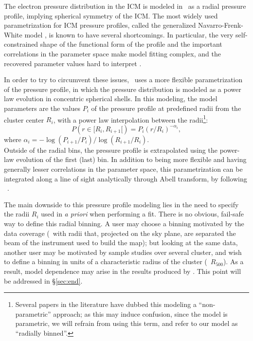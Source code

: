The electron pressure distribution in the ICM is modeled in \panco\ as a radial pressure profile, implying spherical symmetry of the ICM.
The most widely used parametrization for ICM pressure profiles, called the generalized Navarro-Frenk-White model \citep[gNFW,][]{zhao_analytical_1996, nagai_effects_2007}, is known to have several shortcomings.
In particular, the very self-constrained shape of the functional form of the profile and the important correlations in the parameter space make model fitting complex, and the recovered parameter values hard to interpret \citep[see \eg][]{nagai_effects_2007, battaglia_cluster_2012-1, sayers_evolution_2022}.

In order to try to circumvent these issues, \panco\ uses a more flexible parametrization of the pressure profile, in which the pressure distribution is modeled as a power law evolution in concentric spherical shells.
In this modeling, the model parameters are the values $P_i$ of the pressure profile at predefined radii from the cluster center $R_i$, with a power law interpolation between the radii\footnote{Several papers in the literature have dubbed this modeling a ``non-parametric'' approach; as this may induce confusion, since the model is parametric, we will refrain from using this term, and refer to our model as ``radially binned''.}:
\begin{equation}
    \label{eq:algo:pressure_profile}
    P(r \in [R_i, R_{i+1}[) = P_i \left(r / R_i\right)^{-\alpha_i},
\end{equation}
where $\alpha_i = - \log(P_{i+1} / P_i) / \log(R_{i+1} / R_i)$. \\
Outside of the radial bins, the pressure profile is extrapolated using the power-law evolution of the first (last) bin.
In addition to being more flexible and having generally lesser correlations in the parameter space, this parametrization can be integrated along a line of sight analytically through Abell transform, by following \eg\ \citet{romero_multi-instrument_2018}.

The main downside to this pressure profile modeling lies in the need to specify the radii $R_i$ used in  \textit{a priori} when performing a fit.
There is no obvious, fail-safe way to define this radial binning.
A user may choose a binning motivated by the data coverage (\eg\ with radii that, projected on the sky plane, are separated the beam of the instrument used to build the map); but looking at the same data, another user may be motivated by sample studies over several cluster, and wish to define a binning in units of a characteristic radius of the cluster (\eg\ $R_{500}$).
As a result, model dependence may arise in the results produced by \panco.
This point will be addressed in \S\ref{sec:end}.

